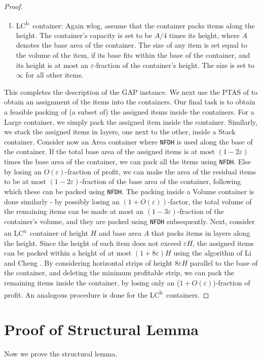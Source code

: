 \documentclass[10pt,a4paper]{amsart}
\renewcommand{\epsilon}{\varepsilon} %
\newcommand{\boxes}{containers\xspace}
\newcommand{\NFDH}{\texttt{NFDH}\xspace}
\theoremstyle{definition}
\newcommand{\lca}{LC\textsuperscript{a}}
\newcommand{\lcb}{LC\textsuperscript{b}}
\begin{document}
\begin{proof}
\begin{enumerate}
        \item \lcb\ container: Again wlog, assume that the container packs items along the height. The container's capacity is set to be $A/4$ times its height, where $A$ denotes the base area of the container. The size of any item is set equal to the volume of the item, if its base fits within the base of the container, and its height is at most an $\epsilon$-fraction of the container's height. The size is set to $\infty$ for all other items.
    \end{enumerate}

    This completes the description of the GAP instance. We next use the PTAS of \cite{2dks-Lpacking} to obtain an assignment of the items into the \boxes. Our final task is to obtain a feasible packing of (a subset of) the assigned items inside the \boxes. For a Large container, we simply pack the assigned item inside the container. Similarly, we stack the assigned items in layers, one next to the other, inside a Stack container. Consider now an Area container where \NFDH is used along the base of the container. If the total base area of the assigned items is at most $(1-2\epsilon)$ times the base area of the container, we can pack all the items using \NFDH. Else by losing an $O(\epsilon)$-fraction of profit, we can make the area of the residual items to be at most $(1-2\epsilon)$-fraction of the base area of the container, following which these can be packed using \NFDH. The packing inside a Volume container is done similarly - by possibly losing an $(1+O(\epsilon))$-factor, the total volume of the remaining items can be made at most an $(1-3\epsilon)$-fraction of the container's volume, and they are packed using \NFDH subsequently. Next, consider an \lca\ container of height $H$ and base area $A$ that packs items in layers along the height. Since the height of each item does not exceed $\epsilon H$, the assigned items can be packed within a height of at most $(1+8\epsilon)H$ using the algorithm of Li and Cheng \cite{li1990three}. By considering horizontal strips of height $8\epsilon H$ parallel to the base of the container, and deleting the minimum profitable strip, we can pack the remaining items inside the container, by losing only an ($1+O(\epsilon)$)-fraction of profit. An analogous procedure is done for the \lcb\ \boxes.
\end{proof}
\fi


\section{Proof of Structural Lemma}
\label{sec:structurallemma}
Now we prove the structural lemma. 
\end{document}
